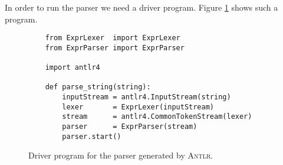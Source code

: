 In order to run the parser we need a driver program.  Figure \ref{fig:PureParser.ipynb} shows such a program.

\begin{figure}[!ht]
\centering
\begin{verbatim}
    from ExprLexer  import ExprLexer
    from ExprParser import ExprParser
    
    import antlr4
    
    def parse_string(string): 
        inputStream = antlr4.InputStream(string)
        lexer       = ExprLexer(inputStream)
        stream      = antlr4.CommonTokenStream(lexer)
        parser      = ExprParser(stream)
        parser.start()
\end{verbatim}
\vspace*{-0.3cm}
\caption{Driver program for the parser generated by \textsc{Antlr}.}
\label{fig:PureParser.ipynb}
\end{figure}

